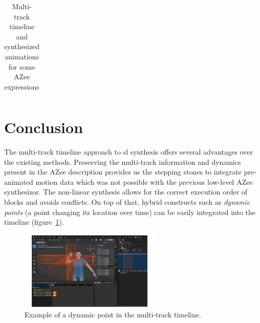 \documentclass[../../main.tex]{subfiles}
\begin{document}
\begin{table}[H]
\begin{tabular}{|c|p{4.5cm}|p{2cm}|}
        \hline
    \end{tabular}
    \caption{Multi-track timeline and synthesized animations for some AZee expressions}
    \label{tab:azee_to_blender}
\end{table}

\section{Conclusion}
\label{ch:multi_track:conclusion}

The multi-track timeline approach to \gls{sl} synthesis offers several advantages over the existing methods. Preserving the multi-track information and dynamics present in the AZee description provides us the stepping stones to integrate pre-animated motion data which was not possible with the previous low-level AZee synthesizor. The non-linear synthesis allows for the correct execution order of blocks and avoids conflicts. On top of that, hybrid constructs such as \emph{dynamic points} (a point changing its location over time) can be easily integrated into the timeline (figure~\ref{fig:dynpoint_example}).

\begin{figure}[h]
    \centering
    \includegraphics[width=0.6\textwidth]{chapters/multi_track/images/dynpoint_example.png}
    \caption{Example of a dynamic point in the multi-track timeline.}
    \label{fig:dynpoint_example}
\end{figure}
\end{document}
